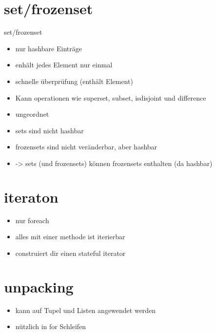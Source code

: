 \section{set/frozenset}
\begin{frame}{set/frozenset}
\begin{itemize}
	\item nur hashbare Einträge
	\item enhält jedes Element nur einmal
	\item schnelle  überprüfung (enthält Element)
	\item Kann operationen wie superset, subset, isdisjoint und difference 
	\item ungeordnet
	\item sets sind nicht hashbar
	\item frozensets sind nicht veränderbar, aber hashbar
	\item -> sets (und frozensets) können frozensets enthalten (da hashbar)
\end{itemize}

\end{frame}

\section{iteraton}
\begin{frame}
\begin{itemize}
	\item nur foreach
	\item alles mit einer  methode ist iterierbar
	\item {} construiert dir einen stateful iterator
\end{itemize}

\end{frame}

\section{unpacking}
\begin{frame}
\begin{itemize}
	\item kann auf Tupel und Listen angewendet werden
	\item nützlich in for Schleifen
\end{itemize}

\end{frame}


